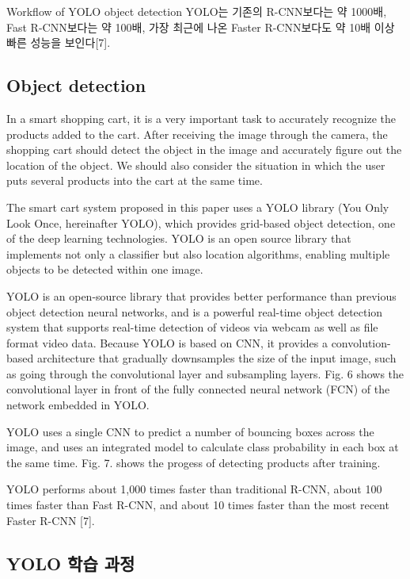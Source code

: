 \documentclass[smallextended]{svjour3}       %
\begin{document}
Workflow of YOLO object detection YOLO는 기존의 R-CNN보다는 약 1000배,
Fast R-CNN보다는 약 100배, 가장 최근에 나온 Faster R-CNN보다도 약 10배
이상 빠른 성능을 보인다{[}7{]}.

\hypertarget{object-detection}{%
\subsection{Object detection}\label{object-detection}}

In a smart shopping cart, it is a very important task to accurately
recognize the products added to the cart. After receiving the image
through the camera, the shopping cart should detect the object in the
image and accurately figure out the location of the object. We should
also consider the situation in which the user puts several products into
the cart at the same time.

The smart cart system proposed in this paper uses a YOLO library (You
Only Look Once, hereinafter YOLO), which provides grid-based object
detection, one of the deep learning technologies. YOLO is an open source
library that implements not only a classifier but also location
algorithms, enabling multiple objects to be detected within one
image\cite{redmon2016you}.

YOLO is an open-source library that provides better performance than
previous object detection neural networks, and is a powerful real-time
object detection system that supports real-time detection of videos via
webcam as well as file format video data. Because YOLO is based on CNN,
it provides a convolution-based architecture that gradually downsamples
the size of the input image, such as going through the convolutional
layer and subsampling layers. Fig. 6 shows the convolutional layer in
front of the fully connected neural network (FCN) of the network
embedded in YOLO.

YOLO uses a single CNN to predict a number of bouncing boxes across the
image, and uses an integrated model to calculate class probability in
each box at the same time. Fig. 7. shows the progess of detecting
products after training.

YOLO performs about 1,000 times faster than traditional R-CNN, about 100
times faster than Fast R-CNN, and about 10 times faster than the most
recent Faster R-CNN {[}7{]}.

\hypertarget{yolo-uxd559uxc2b5-uxacfcuxc815}{%
\subsection{YOLO 학습 과정}\label{yolo-uxd559uxc2b5-uxacfcuxc815}}
\end{document}

